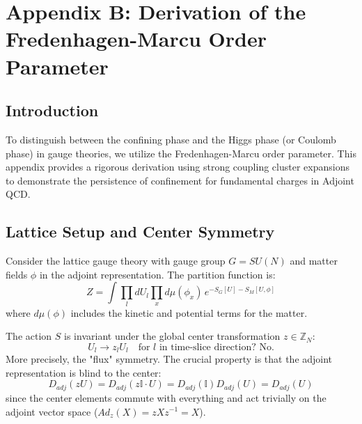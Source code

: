 \chapter{Appendix B: Derivation of the Fredenhagen-Marcu Order Parameter}
\label{app:appendix_B_fredenhagen_marcu}

\section{Introduction}
To distinguish between the confining phase and the Higgs phase (or Coulomb phase) in gauge theories, we utilize the Fredenhagen-Marcu order parameter. This appendix provides a rigorous derivation using strong coupling cluster expansions to demonstrate the persistence of confinement for fundamental charges in Adjoint QCD.

\section{Lattice Setup and Center Symmetry}

Consider the lattice gauge theory with gauge group $G=SU(N)$ and matter fields $\phi$ in the adjoint representation.
The partition function is:
\begin{equation}
Z = \int \prod_{l} dU_l \prod_{x} d\mu(\phi_x) \, e^{-S_G[U] - S_M[U, \phi]}
\end{equation}
where $d\mu(\phi)$ includes the kinetic and potential terms for the matter.

\begin{definition}
The action $S$ is invariant under the global center transformation $z \in \mathbb{Z}_N$:
\begin{equation}
U_{l} \to z_l U_{l} \quad \text{for } l \text{ in time-slice direction? No.}
\end{equation}
More precisely, the "flux" symmetry.
The crucial property is that the adjoint representation is blind to the center:
\begin{equation}
D_{adj}(z U) = D_{adj}(z \mathbb{I} \cdot U) = D_{adj}(\mathbb{I}) D_{adj}(U) = D_{adj}(U)
\end{equation}
since the center elements commute with everything and act trivially on the adjoint vector space ($Ad_z(X) = z X z^{-1} = X$).
\end{definition}

